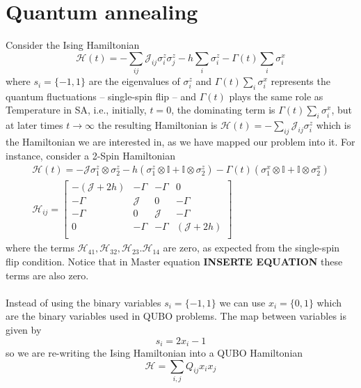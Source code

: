 \section{Quantum annealing}
Consider the Ising Hamiltonian
\begin{equation}
    \mathcal{H}(t) = -\sum_{ij}\mathcal{J}_{ij}\sigma_{i}^{z}\sigma_{j}^{z} - h\sum_{i}\sigma_{i}^{z} - \Gamma(t)\sum_{i}\sigma_{i}^{x}
\end{equation}
where $s_{i} = \{-1,1\}$ are the eigenvalues of $\sigma_{i}^{z}$ and $\Gamma(t)\sum_{i}\sigma_{i}^{x}$ represents the quantum fluctuations -- single-spin flip -- and $\Gamma(t)$ plays the same role as Temperature in SA, i.e., initially, $t=0$, the dominating term is $\Gamma(t)\sum_{i}\sigma_{i}^{x}$, but at later times $t \rightarrow \infty$ the resulting Hamiltonian is $\mathcal{H}(t) = -\sum_{ij}\mathcal{J}_{ij}\sigma_{i}^{z}$ which is the Hamiltonian we are interested in, as we have mapped our problem into it. For instance, consider a 2-Spin Hamiltonian
\begin{align}
    \mathcal{H}(t) = -\mathcal{J}\sigma_{1}^{z}\otimes \sigma_{2}^{z} - h\left(\sigma_{1}^{z}\otimes \mathbb{I} + \mathbb{I}\otimes \sigma_{2}^{z}\right) - \Gamma(t) \left(\sigma_{1}^{x}\otimes\mathbb{I} + \mathbb{I}\otimes \sigma_{2}^{x}\right)\\
    \mathcal{H}_{ij}= \begin{bmatrix}
        -\left(\mathcal{J} + 2h\right) & -\Gamma & -\Gamma & 0 \\
        -\Gamma & \mathcal{J} & 0 & -\Gamma \\
        -\Gamma & 0 & \mathcal{J} & -\Gamma \\
        0 & -\Gamma & -\Gamma & \left(\mathcal{J} + 2h\right) \\
    \end{bmatrix}
\end{align}
where the terms $\mathcal{H}_{41},\mathcal{H}_{32}, \mathcal{H}_{23}. \mathcal{H}_{14}$ are zero, as expected from the single-spin flip condition. Notice that in Master equation \textbf{INSERTE EQUATION} these terms are also zero.\\\\
Instead of using the binary variables $s_{i} = \{-1,1\}$ we can use $x_{i} = \{0,1\}$ which are the binary variables used in QUBO problems. The map between variables is given by
\begin{equation}
    s_{i} = 2x_{i} -1
\end{equation}
so we are re-writing the Ising Hamiltonian into a QUBO Hamiltonian
\begin{equation}
    \mathcal{H} = \sum_{i,j}Q_{ij}x_{i}x_{j}
\end{equation}
